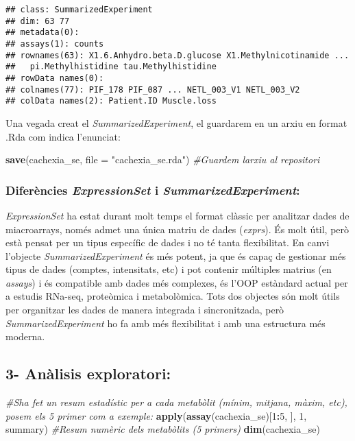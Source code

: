 \documentclass[
]{article}
\newenvironment{Shaded}{\begin{snugshade}}{\end{snugshade}}
\newcommand{\AttributeTok}[1]{\textcolor[rgb]{0.13,0.29,0.53}{#1}}
\newcommand{\CommentTok}[1]{\textcolor[rgb]{0.56,0.35,0.01}{\textit{#1}}}
\newcommand{\DecValTok}[1]{\textcolor[rgb]{0.00,0.00,0.81}{#1}}
\newcommand{\FunctionTok}[1]{\textcolor[rgb]{0.13,0.29,0.53}{\textbf{#1}}}
\newcommand{\NormalTok}[1]{#1}
\newcommand{\SpecialCharTok}[1]{\textcolor[rgb]{0.81,0.36,0.00}{\textbf{#1}}}
\newcommand{\StringTok}[1]{\textcolor[rgb]{0.31,0.60,0.02}{#1}}
\begin{document}
\begin{verbatim}
## class: SummarizedExperiment 
## dim: 63 77 
## metadata(0):
## assays(1): counts
## rownames(63): X1.6.Anhydro.beta.D.glucose X1.Methylnicotinamide ...
##   pi.Methylhistidine tau.Methylhistidine
## rowData names(0):
## colnames(77): PIF_178 PIF_087 ... NETL_003_V1 NETL_003_V2
## colData names(2): Patient.ID Muscle.loss
\end{verbatim}

Una vegada creat el \emph{SummarizedExperiment}, el guardarem en un
arxiu en format .Rda com indica l'enunciat:

\begin{Shaded}
\begin{Highlighting}[]
\FunctionTok{save}\NormalTok{(cachexia\_se, }\AttributeTok{file =} \StringTok{"cachexia\_se.rda"}\NormalTok{) }\CommentTok{\#Guardem l\textquotesingle{}arxiu al repositori}
\end{Highlighting}
\end{Shaded}

\subsubsection{\texorpdfstring{Diferències \emph{ExpressionSet} i
\emph{SummarizedExperiment}:}{Diferències ExpressionSet i SummarizedExperiment:}}\label{diferuxe8ncies-expressionset-i-summarizedexperiment}

\emph{ExpressionSet} ha estat durant molt temps el format clàssic per
analitzar dades de miacroarrays, només admet una única matriu de dades
(\emph{exprs}). És molt útil, però està pensat per un tipus específic de
dades i no té tanta flexibilitat. En canvi l'objecte
\emph{SummarizedExperiment} és més potent, ja que és capaç de gestionar
més tipus de dades (comptes, intensitats, etc) i pot contenir múltiples
matrius (en \emph{assays}) i és compatible amb dades més complexes, és
l'OOP estàndard actual per a estudis RNa-seq, proteòmica i metabolòmica.
Tots dos objectes són molt útils per organitzar les dades de manera
integrada i sincronitzada, però \emph{SummarizedExperiment} ho fa amb
més flexibilitat i amb una estructura més moderna.

\subsection{3- Anàlisis exploratori:}\label{anuxe0lisis-exploratori}

\begin{Shaded}
\begin{Highlighting}[]
\CommentTok{\#S\textquotesingle{}ha fet un resum estadístic per a cada metabòlit (mínim, mitjana, màxim, etc), posem els 5 primer com a exemple:}
\FunctionTok{apply}\NormalTok{(}\FunctionTok{assay}\NormalTok{(cachexia\_se)[}\DecValTok{1}\SpecialCharTok{:}\DecValTok{5}\NormalTok{, ], }\DecValTok{1}\NormalTok{, summary) }\CommentTok{\#Resum numèric dels metabòlits (5 primers)}
\FunctionTok{dim}\NormalTok{(cachexia\_se)}
\end{Highlighting}
\end{Shaded}
\end{document}
